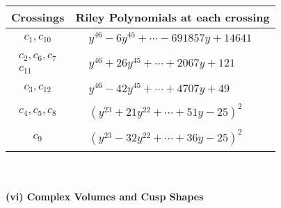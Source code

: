 \documentclass[1p]{elsarticle_modified}
\theoremstyle{definition}
\begin{document}
\begin{tabular}{m{50pt}|m{274pt}}
Crossings & \hspace{64pt}Riley Polynomials at each crossing \\
\hline $$\begin{aligned}c_{1},c_{10}\end{aligned}$$&$\begin{aligned}
&y^{46}-6 y^{45}+\cdots-691857 y+14641
\end{aligned}$\\
\hline $$\begin{aligned}c_{2},c_{6},c_{7}\\c_{11}\end{aligned}$$&$\begin{aligned}
&y^{46}+26 y^{45}+\cdots+2067 y+121
\end{aligned}$\\
\hline $$\begin{aligned}c_{3},c_{12}\end{aligned}$$&$\begin{aligned}
&y^{46}-42 y^{45}+\cdots+4707 y+49
\end{aligned}$\\
\hline $$\begin{aligned}c_{4},c_{5},c_{8}\end{aligned}$$&$\begin{aligned}
&(y^{23}+21 y^{22}+\cdots+51 y-25)^{2}
\end{aligned}$\\
\hline $$\begin{aligned}c_{9}\end{aligned}$$&$\begin{aligned}
&(y^{23}-32 y^{22}+\cdots+36 y-25)^{2}
\end{aligned}$\\
\hline
\end{tabular}\\~\\
\newpage\flushleft \textbf{(vi) Complex Volumes and Cusp Shapes}
\end{document}
